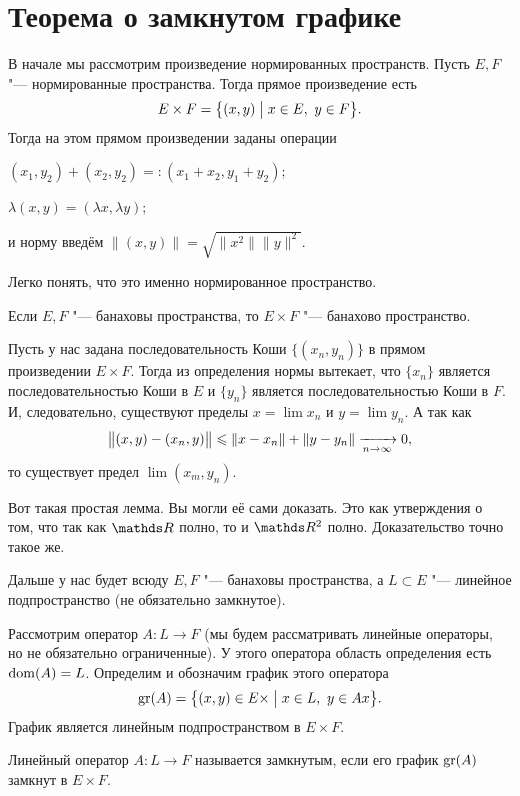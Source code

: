 \section{Теорема о замкнутом графике}
В начале мы рассмотрим произведение нормированных пространств. Пусть $E,F$ "--- нормированные пространства. Тогда прямое произведение есть 
\[
E\times F = \big\{(x,y)\bigm| x\in E,\ y\in F\big\}.
\]
Тогда на этом прямом произведении заданы операции
\begin{azItems}
\item $(x_1,y_2)+(x_2,y_2) =: (x_1+x_2,y_1+y_2)$;
\item $\lambda (x,y) = (\lambda x,\lambda y)$;
\item и норму введём $\big\|(x,y)\big\| = \sqrt{\|x^2\|\|y\|^2}$.
\end{azItems}
Легко понять, что это именно нормированное пространство.

\begin{Lem}
  Если $E,F$ "--- банаховы пространства, то $E\times F$ "--- банахово пространство.
\end{Lem}
\begin{Proof}
  Пусть у нас задана последовательность Коши $\big\{(x_n,y_n)\big\}$ в прямом произведении $E\times F$. Тогда из определения нормы вытекает, что $\{x_n\}$ является последовательностью Коши в $E$ и $\{y_n\}$ является последовательностью Коши в $F$. И, следовательно, существуют пределы $x = \lim x_n$ и $y = \lim y_n$. А так как
\[
  \big\|(x,y) - (x_n,y)\big\|\leqslant \|x-x_n\| + \|y-y_n\|\xrightarrow[n\rightarrow\infty]{}0,
\]
то существует предел $\lim(x_m,y_n)$.
\end{Proof}

Вот такая простая лемма. Вы могли её сами доказать. Это как утверждения о том, что так как $\R$  полно, то и $\R^2$ полно. Доказательство точно такое же.

Дальше у нас будет всюду $E,F$ "--- банаховы пространства, а $L\subset E$ "--- линейное подпространство (не обязательно замкнутое).

Рассмотрим оператор $A\colon L\to F$ (мы будем рассматривать линейные операторы, но не обязательно ограниченные). У этого оператора область определения есть $\operatorname{dom} (A) = L$.
Определим и обозначим график этого оператора
\[
  \operatorname{gr}(A) = \big\{(x,y)\in E\times \bigm| x\in L,\ y\in Ax\big\}.
\]
График является линейным подпространством в $E\times F$.
\begin{Def}
  Линейный оператор $A\colon L\to F$ называется замкнутым, если его график $\operatorname{gr}(A)$ замкнут в $E\times F$.
\end{Def}

